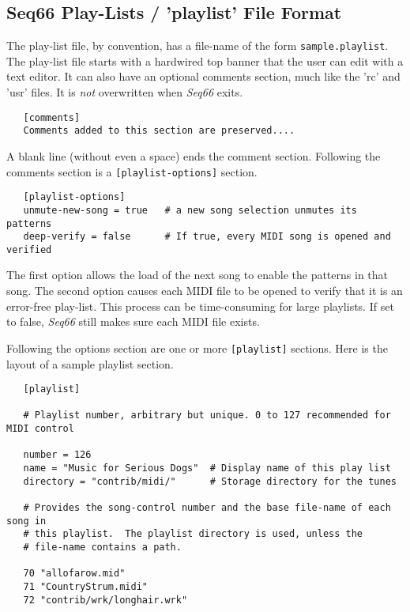 \subsection{Seq66 Play-Lists / 'playlist' File Format}
\label{subsec:playlist_setup}

   The play-list file, by convention, has a file-name of the form
   \texttt{sample.playlist}.
   The play-list file starts with a hardwired top banner that the user can edit
   with a text editor.  It can also have an optional comments section, much
   like the 'rc' and 'usr' files.  It is \textsl{not} overwritten
   when \textsl{Seq66} exits.

   \begin{verbatim}
   [comments]
   Comments added to this section are preserved....
   \end{verbatim}

   A blank line (without even a space) ends the comment section.
   Following the comments section is a \texttt{[playlist-options]} section.

   \begin{verbatim}
   [playlist-options]
   unmute-new-song = true   # a new song selection unmutes its patterns
   deep-verify = false      # If true, every MIDI song is opened and verified
   \end{verbatim}

   The first option allows the load of the next song to enable the patterns in
   that song.
   The second option causes each MIDI file to be opened to verify that it is an
   error-free play-list.  This process can be time-consuming for large
   playlists.  If set to false, \textsl{Seq66} still makes sure each MIDI
   file exists.

   Following the options section are one or more \texttt{[playlist]} sections.
   Here is the layout of a sample playlist section.

   \begin{verbatim}
   [playlist]

   # Playlist number, arbitrary but unique. 0 to 127 recommended for MIDI control

   number = 126
   name = "Music for Serious Dogs"  # Display name of this play list
   directory = "contrib/midi/"      # Storage directory for the tunes

   # Provides the song-control number and the base file-name of each song in
   # this playlist.  The playlist directory is used, unless the
   # file-name contains a path.

   70 "allofarow.mid"
   71 "CountryStrum.midi"
   72 "contrib/wrk/longhair.wrk"
   \end{verbatim}

